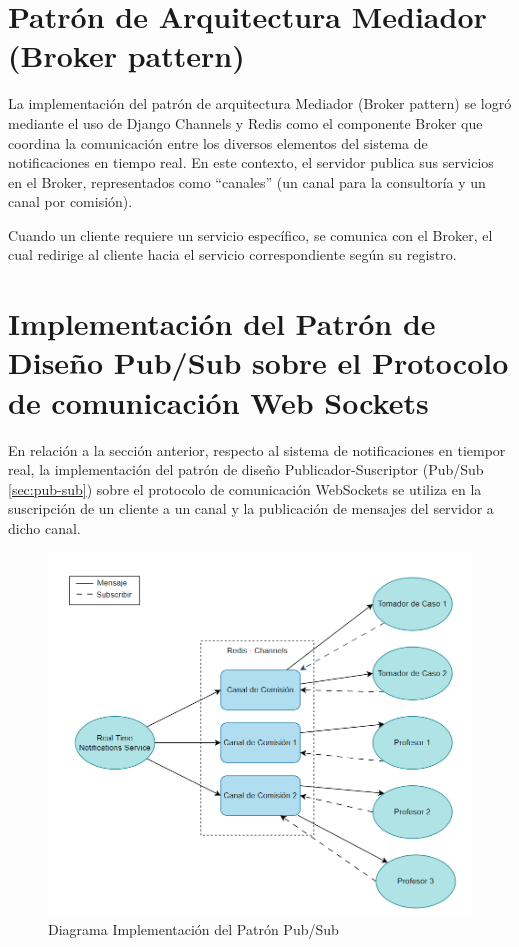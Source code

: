 \section{Patrón de Arquitectura Mediador (Broker pattern)}
La implementación del patrón de arquitectura Mediador (Broker pattern) se logró mediante el uso de Django Channels y Redis como el componente Broker que coordina la comunicación entre los diversos elementos del sistema de notificaciones en tiempo real. En este contexto, el servidor publica sus servicios en el Broker, representados como ``canales'' (un canal para la consultoría y un canal por comisión).

Cuando un cliente requiere un servicio específico, se comunica con el Broker, el cual redirige al cliente hacia el servicio correspondiente según su registro.


\section{Implementación del Patrón de Diseño Pub/Sub sobre el Protocolo de comunicación Web Sockets}

En relación a la sección anterior, respecto al sistema de notificaciones en tiempor real, la implementación del patrón de diseño Publicador-Suscriptor (Pub/Sub \ref{sec:pub-sub}) sobre el protocolo de comunicación WebSockets se utiliza en la suscripción de un cliente a un canal y la publicación de mensajes del servidor a dicho canal.

\begin{figure}[H]
    \centering
    \includegraphics[width=0.9\linewidth]{fig/channels.png}
    \caption{Diagrama Implementación del Patrón Pub/Sub}
    \label{fig:channels-redis}
\end{figure}

